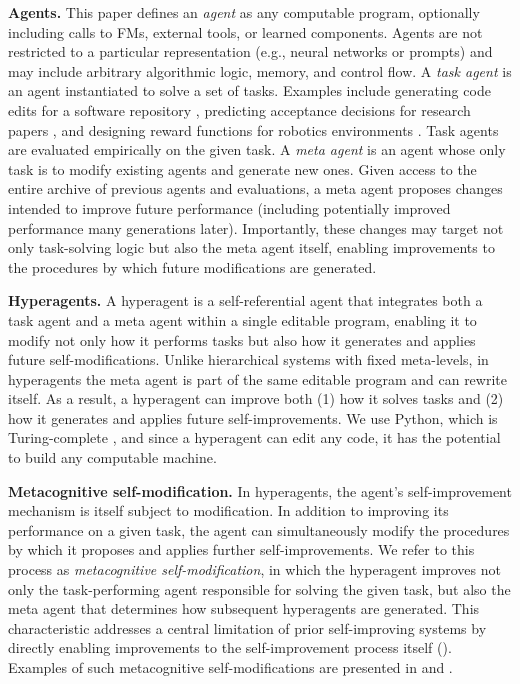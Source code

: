 \documentclass[]{fairmeta}
\begin{document}
\textbf{Agents.} This paper defines an \textit{agent} as any computable program, optionally including calls to FMs, external tools, or learned components. Agents are not restricted to a particular representation (e.g., neural networks or prompts) and may include arbitrary algorithmic logic, memory, and control flow.
A \textit{task agent} is an agent instantiated to solve a set of tasks. Examples include generating code edits for a software repository \citep{gauthier2024polyglot, jimenez2024swebench}, predicting acceptance decisions for research papers \citep{couto2024relevai}, and designing reward functions for robotics environments \citep{maeureka}. Task agents are evaluated empirically on the given task.
A \textit{meta agent} is an agent whose only task is to modify existing agents and generate new ones. Given access to the entire archive of previous agents and evaluations, a meta agent proposes changes intended to improve future performance (including potentially improved performance many generations later). Importantly, these changes may target not only task-solving logic but also the meta agent itself, enabling improvements to the procedures by which future modifications are generated.

\textbf{Hyperagents.} A hyperagent is a self-referential agent that integrates both a task agent and a meta agent within a single editable program, enabling it to modify not only how it performs tasks but also how it generates and applies future self-modifications. Unlike hierarchical systems with fixed meta-levels, in hyperagents the meta agent is part of the same editable program and can rewrite itself. As a result, a hyperagent can improve both (1) how it solves tasks and (2) how it generates and applies future self-improvements. We use Python, which is Turing-complete \citep{turing1936computable}, and since a hyperagent can edit any code, it has the potential to build any computable machine.

\textbf{Metacognitive self-modification.} In hyperagents, the agent's self-improvement mechanism is itself subject to modification. In addition to improving its performance on a given task, the agent can simultaneously modify the procedures by which it proposes and applies further self-improvements. We refer to this process as \textit{metacognitive self-modification}, in which the hyperagent improves not only the task-performing agent responsible for solving the given task, but also the meta agent that determines how subsequent hyperagents are generated. This characteristic addresses a central limitation of prior self-improving systems \citep{zhang2025darwin, wang2025huxley} by directly enabling improvements to the self-improvement process itself (). Examples of such metacognitive self-modifications are presented in  and .
\end{document}
